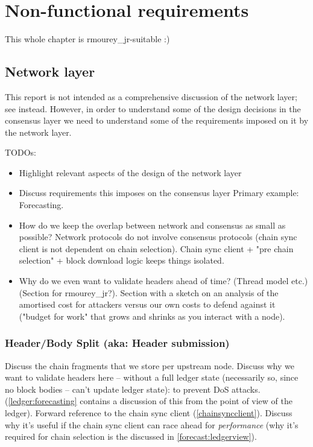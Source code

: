\chapter{Non-functional requirements}
\label{nonfunctional}

This whole chapter is rmourey_jr-suitable :)
\duncan

\section{Network layer}
\label{nonfunctional:network}

This report is not intended as a comprehensive discussion of the network layer;
see \cite{network-spec} instead. However, in order to understand
some of the design decisions in the consensus layer we need to understand some
of the requirements imposed on it by the network layer.

TODOs:

\begin{itemize}
\item Highlight relevant aspects of the design of the network layer
\item Discuss requirements this imposes on the consensus layer
Primary example: Forecasting.
\item How do we keep the overlap between network and consensus as small
as possible? Network protocols do not involve consensus protocols
(chain sync client is not dependent on chain selection). Chain sync
client + "pre chain selection" + block download logic keeps things isolated.
\item Why do we even want to validate headers ahead of time? (Thread model etc.)
(Section for rmourey_jr?).
Section with a sketch on an analysis of the amortised cost for attackers versus
our own costs to defend against it ("budget for work" that grows and shrinks
as you interact with a node).
\end{itemize}

\subsection{Header/Body Split (aka: Header submission)}
\label{nonfunctional:network:headerbody}

Discuss the chain fragments that we store per upstream node.
Discuss why we want to validate headers here -- without a full ledger state
(necessarily so, since no block bodies -- can't update ledger state): to prevent
DoS attacks.
(\cref{ledger:forecasting} contains a discussion of this from the point of view of
the ledger).
Forward reference to the chain sync client (\cref{chainsyncclient}).
Discuss why it's useful if the chain sync client can race ahead  for
\emph{performance} (why it's required for chain selection is the discussed in
\cref{forecast:ledgerview}).

